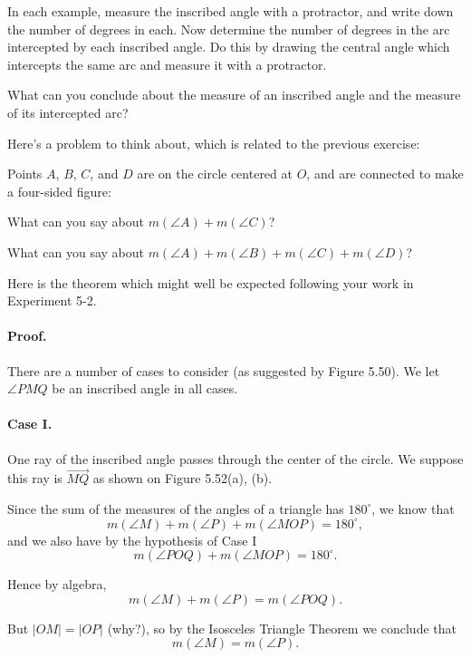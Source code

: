 \documentclass[12pt]{book} %
\begin{document}
In each example, measure the inscribed angle with a protractor, and write down the number of degrees in each. Now determine the number of degrees in the arc intercepted by each inscribed angle. Do this by drawing the central angle which intercepts the same arc and measure it with a protractor.

What can you conclude about the measure of an inscribed angle and the measure of its intercepted arc?

Here's a problem to think about, which is related to the previous exercise:

Points $A$, $B$, $C$, and $D$ are on the circle centered at $O$, and are connected to make a four-sided figure:


What can you say about $m(\angle A)+m(\angle C)$?

What can you say about $m(\angle A)+m(\angle B)+m(\angle C)+m(\angle D)$?

Here is the theorem which might well be expected following your work in Experiment 5-2.


\paragraph{Proof.}
There are a number of cases to consider (as suggested by Figure 5.50). We let $\angle PMQ$ be an inscribed angle in all cases.

\paragraph{Case I.}
One ray of the inscribed angle passes through the center of the circle. We suppose this ray is $\overrightarrow{MQ}$ as shown on Figure 5.52(a), (b).


Since the sum of the measures of the angles of a triangle has $180^\circ$, we know that
\[
m(\angle M)+m(\angle P)+m(\angle MOP)=180^\circ,
\]
and we also have by the hypothesis of Case I
\[
m(\angle POQ)+m(\angle MOP)=180^\circ.
\]

Hence by algebra,
\[
m(\angle M)+m(\angle P)=m(\angle POQ).
\]

But $|OM|=|OP|$ (why?), so by the Isosceles Triangle Theorem we conclude that
\[
m(\angle M)=m(\angle P).
\]
\end{document}
